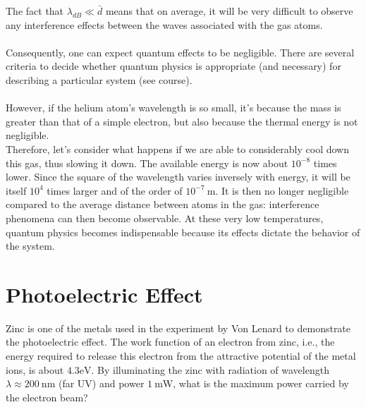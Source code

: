 \begin{breakbox}
    \noindent The fact that $\lambda_{dB} \ll \bar{d}$ means that on average, it will be very difficult to observe any interference effects between the waves associated with the gas atoms.\\ \\
    Consequently, one can expect quantum effects to be negligible. There are several criteria to decide whether quantum physics is appropriate (and necessary) for describing a particular system (see course).\\ \\
    However, if the helium atom's wavelength is so small, it's because the mass is greater than that of a simple electron, but also because the thermal energy is not negligible.\\
    Therefore, let's consider what happens if we are able to considerably cool down this gas, thus slowing it down. The available energy is now about $10^{-8}$ times lower.
    Since the square of the wavelength varies inversely with energy, it will be itself $10^4$ times larger and of the order of $10^{-7}\ \mathrm{m}$.
    It is then no longer negligible compared to the average distance between atoms in the gas: interference phenomena can then become observable.
    At these very low temperatures, quantum physics becomes indispensable because its effects dictate the behavior of the system.
\end{breakbox}

\section{Photoelectric Effect}

\noindent Zinc is one of the metals used in the experiment by Von Lenard to demonstrate the photoelectric effect. The work function of an electron from zinc, i.e., the energy required to release this electron from the attractive potential of the metal ions, is about $4.3 \mathrm{eV}$. By illuminating the zinc with radiation of wavelength $\lambda \approx 200 \mathrm{~nm}$ (far UV) and power $1 \mathrm{~mW}$, what is the maximum power carried by the electron beam?\\

